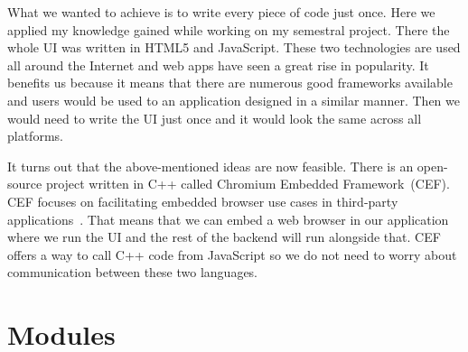 \par
What we wanted to achieve is to write every piece of code just once. Here we applied my knowledge gained while working on my semestral project. There the whole UI was written in HTML5 and JavaScript. These two technologies are used all around the Internet and web apps have seen a great rise in popularity. It benefits us because it means that there are numerous good frameworks available and users would be used to an application designed in a similar manner. Then we would need to write the UI just once and it would look the same across all platforms.
\par
It turns out that the above-mentioned ideas are now feasible. There is an open-source project written in C++ called Chromium Embedded Framework~(CEF). CEF focuses on facilitating embedded browser use cases in third-party applications~\citep{cef}. That means that we can embed a web browser in our application where we run the UI and the rest of the backend will run alongside that. CEF offers a way to call C++ code from JavaScript so we do not need to worry about communication between these two languages.


\section{Modules}

